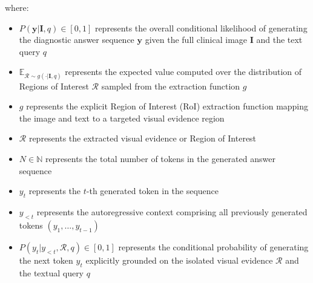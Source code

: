 where:
\begin{itemize}
\item $P(\mathbf{y} | \mathbf{I}, q) \in [0,1]$ represents the overall conditional likelihood of generating the diagnostic answer sequence $\mathbf{y}$ given the full clinical image $\mathbf{I}$ and the text query $q$
\item $\mathbb{E}_{\mathcal{R} \sim g(\cdot|\mathbf{I},q)}$ represents the expected value computed over the distribution of Regions of Interest $\mathcal{R}$ sampled from the extraction function $g$
\item $g$ represents the explicit Region of Interest (RoI) extraction function mapping the image and text to a targeted visual evidence region
\item $\mathcal{R}$ represents the extracted visual evidence or Region of Interest
\item $N \in \mathbb{N}$ represents the total number of tokens in the generated answer sequence
\item $y_t$ represents the $t$-th generated token in the sequence
\item $y_{<t}$ represents the autoregressive context comprising all previously generated tokens $(y_1, \dots, y_{t-1})$
\item $P(y_{t}|y_{<t},\mathcal{R},q) \in [0,1]$ represents the conditional probability of generating the next token $y_t$ explicitly grounded on the isolated visual evidence $\mathcal{R}$ and the textual query $q$
\end{itemize}

